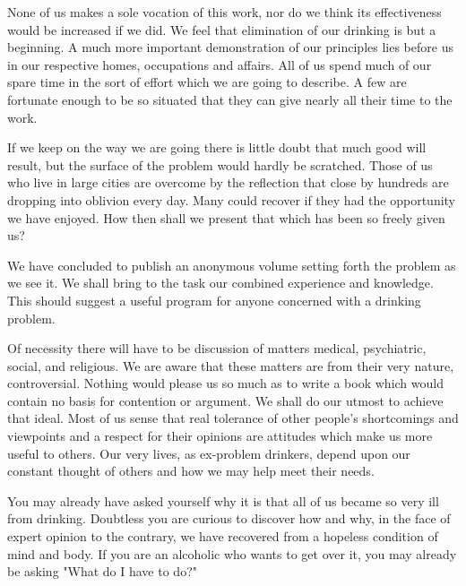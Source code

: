 \begin{biblechapter}

None of us makes a sole vocation of this work, 
nor do we think its effectiveness would be increased if we did. 
We feel that elimination of our drinking is but a beginning. 
A much more important demonstration of our principles lies before us in our respective homes, occupations and affairs. 
All of us spend much of our spare time in the sort of effort which we are going to describe. 
A few are fortunate enough to be so situated that they can give nearly all their time to the work.

If we keep on the way we are going there is little doubt that much good will result, 
but the surface of the problem would hardly be scratched. 
Those of us who live in large cities are overcome by the reflection that close by hundreds are dropping into oblivion every day. 
Many could recover if they had the opportunity we have enjoyed. 
How then shall we present that which has been so freely given us?

We have concluded to publish an anonymous volume setting forth the problem as we see it. 
We shall bring to the task our combined experience and knowledge. 
This should suggest a useful program for anyone concerned with a drinking problem.

Of necessity there will have to be discussion of matters medical, psychiatric, social, and religious. 
We are aware that these matters are from their very nature, controversial. 
Nothing would please us so much as to write a book which would contain no basis for contention or argument. 
We shall do our utmost to achieve that ideal. 
Most of us sense that real tolerance of other people's shortcomings and viewpoints and a respect for their opinions are attitudes which make us more useful to others. 
Our very lives, as ex-problem drinkers, depend upon our constant thought of others and how we may help meet their needs.
\end{biblechapter}


\begin{biblechapter}

You may already have asked yourself why it is that all of us became so very ill from drinking. 
Doubtless you are curious to discover how and why, in the face of expert opinion to the contrary, we have recovered from a hopeless condition of mind and body. 
If you are an alcoholic who wants to get over it, you may already be asking 
"What do I have to do?"
\end{biblechapter}


